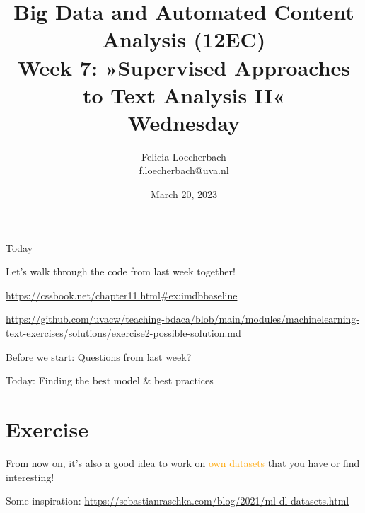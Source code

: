 \documentclass[compress]{beamer}
\begin{document}
\title[Big Data and Automated Content Analysis]{\textbf{Big Data and Automated Content Analysis (12EC)} 
\\Week 7: »Supervised Approaches to Text Analysis II«
\\Wednesday}
\author[Felicia Loecherbach]{Felicia Loecherbach\\ \footnotesize{f.loecherbach@uva.nl\\}}
\date{March 20, 2023}


\begin{frame}{}
	\titlepage
\end{frame}

\begin{frame}{Today}
	\tableofcontents
\end{frame}


\begin{frame}[standout]
Let's walk through the code from last week together!

\url{https://cssbook.net/chapter11.html\#ex:imdbbaseline}

\url{https://github.com/uvacw/teaching-bdaca/blob/main/modules/machinelearning-text-exercises/solutions/exercise2-possible-solution.md}


\end{frame}



\begin{frame}[standout]
Before we start: Questions from last week?
\end{frame}


\begin{frame}[standout]
Today: Finding the best model \& best practices
\end{frame}









\section{Exercise}

\begin{frame}[standout]
From now on, it's also a good idea to work on \textcolor{orange}{own datasets} that you have or find interesting!

Some inspiration: \url{https://sebastianraschka.com/blog/2021/ml-dl-datasets.html}

\end{frame}
\end{document}
